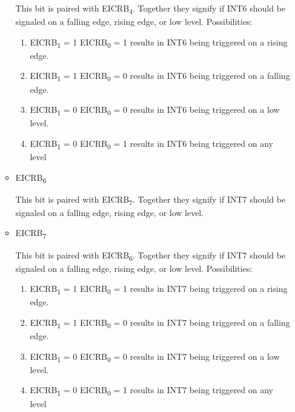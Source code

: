 \documentclass[12pt,letterpaper]{article}
\begin{document}
\begin{enumerate}
\begin{itemize}
			This bit is paired with EICRB\textsubscript{4}.
			Together they signify if INT6 should be signaled on a falling edge, rising edge, or low level.
			Possibilities: 
			\begin{enumerate}
				\item
				EICRB\textsubscript{1} = 1 EICRB\textsubscript{0} = 1 results in INT6 being triggered on a rising edge.
				
				\item
				EICRB\textsubscript{1} = 1 EICRB\textsubscript{0} = 0 results in INT6 being triggered on a falling edge.
				
				\item
				EICRB\textsubscript{1} = 0 EICRB\textsubscript{0} = 0 results in INT6 being triggered on a low level.
				
				\item
				EICRB\textsubscript{1} = 0 EICRB\textsubscript{0} = 1 results in INT6 being triggered on any level
			\end{enumerate}
			
			
			\item
			EICRB\textsubscript{6}
			
			This bit is paired with EICRB\textsubscript{7}.
			Together they signify if INT7 should be signaled on a falling edge, rising edge, or low level.
			
			\item 
			EICRB\textsubscript{7}
			
			This bit is paired with EICRB\textsubscript{6}.
			Together they signify if INT7 should be signaled on a falling edge, rising edge, or low level.
			Possibilities: 
			\begin{enumerate}
				\item
				EICRB\textsubscript{1} = 1 EICRB\textsubscript{0} = 1 results in INT7 being triggered on a rising edge.
				
				\item
				EICRB\textsubscript{1} = 1 EICRB\textsubscript{0} = 0 results in INT7 being triggered on a falling edge.
				
				\item
				EICRB\textsubscript{1} = 0 EICRB\textsubscript{0} = 0 results in INT7 being triggered on a low level.
				
				\item
				EICRB\textsubscript{1} = 0 EICRB\textsubscript{0} = 1 results in INT7 being triggered on any level
			\end{enumerate}
		

\end{itemize}
\end{enumerate}
\end{document}

